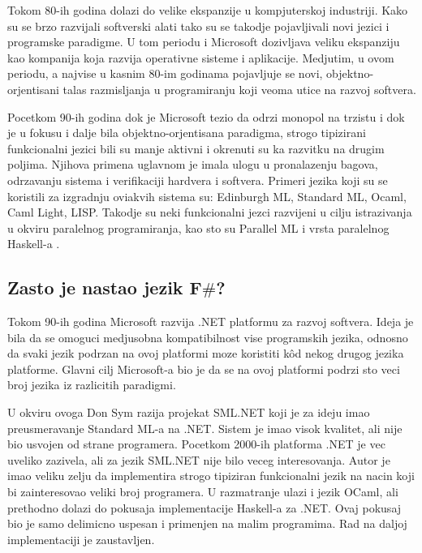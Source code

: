\documentclass[a4paper]{article}
\begin{document}
Tokom 80-ih godina dolazi do velike ekspanzije u kompjuterskoj industriji. Kako su se brzo razvijali softverski alati tako su se takodje pojavljivali novi jezici i programske paradigme. U tom periodu i Microsoft dozivljava veliku ekspanziju kao kompanija koja razvija operativne sisteme i aplikacije. Medjutim, u ovom periodu, a najvise u kasnim 80-im godinama pojavljuje se novi, objektno-orjentisani talas razmisljanja u programiranju koji veoma utice na razvoj softvera.

Pocetkom 90-ih godina dok je Microsoft tezio da odrzi monopol na trzistu i dok je u fokusu i dalje bila objektno-orjentisana paradigma, strogo tipizirani funkcionalni jezici bili su manje aktivni i okrenuti su ka razvitku na drugim poljima. Njihova primena uglavnom je imala ulogu u pronalazenju bagova, odrzavanju sistema i verifikaciji hardvera i softvera. Primeri jezika koji su se koristili za izgradnju oviakvih sistema su: Edinburgh ML, Standard ML, Ocaml, Caml Light, LISP. Takodje su neki funkcionalni jezci razvijeni u cilju istrazivanja u okviru paralelnog programiranja, kao sto su Parallel ML i vrsta paralelnog Haskell-a \cite{early_history}. 

\subsection{Zasto je nastao jezik F$\#$?}
\label{subsec:nastanak}

Tokom 90-ih godina Microsoft razvija .NET \cite{microsoft_.net,early_history} platformu za razvoj softvera. Ideja je bila da se omoguci medjusobna kompatibilnost vise programskih jezika, odnosno da svaki jezik podrzan na ovoj platformi moze koristiti kôd nekog drugog jezika platforme. Glavni cilj Microsoft-a bio je da se na ovoj platformi podrzi sto veci broj jezika iz razlicitih paradigmi. 

U okviru ovoga Don Sym razija projekat SML.NET koji je za ideju imao preusmeravanje Standard ML-a na .NET. Sistem je imao visok kvalitet, ali nije bio usvojen od strane programera. Pocetkom 2000-ih platforma .NET je vec uveliko zazivela, ali za jezik SML.NET nije bilo veceg interesovanja. Autor je imao veliku zelju da implementira strogo tipiziran funkcionalni jezik na nacin koji bi zainteresovao veliki broj programera. U razmatranje ulazi i jezik OCaml, ali prethodno dolazi do pokusaja implementacije Haskell-a za .NET. Ovaj pokusaj bio je samo delimicno uspesan i primenjen na malim programima. Rad na daljoj implementaciji je zaustavljen.
\end{document}
